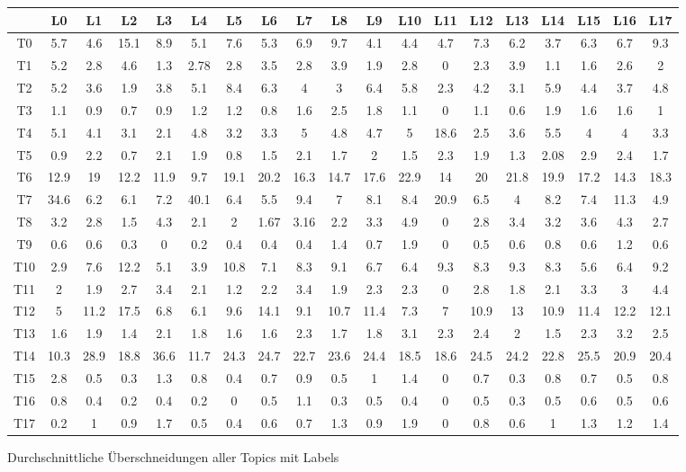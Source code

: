 \documentclass[german,version-2020-11]{uzl-thesis}
\begin{document}
\begin{figure}[H]
\begin{center}
\tiny
\renewcommand{\arraystretch}{2}
\begin{tabular}{ccccccccccccccccccc}
\hline
\hline
&L0&L1&L2&L3&L4&L5&L6&L7&L8&L9&L10&L11&L12&L13&L14&L15&L16&L17\\
\hline
T0&5.7&4.6&15.1&8.9&5.1&7.6&5.3&6.9&9.7&4.1&4.4&4.7&7.3&6.2&3.7&6.3&6.7&9.3\\\hline
T1&5.2&2.8&4.6&1.3&2.78&2.8&3.5&2.8&3.9&1.9&2.8&0&2.3&3.9&1.1&1.6&2.6&2\\\hline
T2&5.2&3.6&1.9&3.8&5.1&8.4&6.3&4&3&6.4&5.8&2.3&4.2&3.1&5.9&4.4&3.7&4.8\\\hline
T3&1.1&0.9&0.7&0.9&1.2&1.2&0.8&1.6&2.5&1.8&1.1&0&1.1&0.6&1.9&1.6&1.6&1\\\hline
T4&5.1&4.1&3.1&2.1&4.8&3.2&3.3&5&4.8&4.7&5&18.6&2.5&3.6&5.5&4&4&3.3\\\hline
T5&0.9&2.2&0.7&2.1&1.9&0.8&1.5&2.1&1.7&2&1.5&2.3&1.9&1.3&2.08&2.9&2.4&1.7\\\hline
T6&12.9&19&12.2&11.9&9.7&19.1&20.2&16.3&14.7&17.6&22.9&14&20&21.8&19.9&17.2&14.3&18.3\\\hline
T7&34.6&6.2&6.1&7.2&40.1&6.4&5.5&9.4&7&8.1&8.4&20.9&6.5&4&8.2&7.4&11.3&4.9\\\hline
T8&3.2&2.8&1.5&4.3&2.1&2&1.67&3.16&2.2&3.3&4.9&0&2.8&3.4&3.2&3.6&4.3&2.7\\\hline
T9&0.6&0.6&0.3&0&0.2&0.4&0.4&0.4&1.4&0.7&1.9&0&0.5&0.6&0.8&0.6&1.2&0.6\\\hline
T10&2.9&7.6&12.2&5.1&3.9&10.8&7.1&8.3&9.1&6.7&6.4&9.3&8.3&9.3&8.3&5.6&6.4&9.2\\\hline
T11&2&1.9&2.7&3.4&2.1&1.2&2.2&3.4&1.9&2.3&2.3&0&2.8&1.8&2.1&3.3&3&4.4\\\hline
T12&5&11.2&17.5&6.8&6.1&9.6&14.1&9.1&10.7&11.4&7.3&7&10.9&13&10.9&11.4&12.2&12.1\\\hline
T13&1.6&1.9&1.4&2.1&1.8&1.6&1.6&2.3&1.7&1.8&3.1&2.3&2.4&2&1.5&2.3&3.2&2.5\\\hline
T14&10.3&28.9&18.8&36.6&11.7&24.3&24.7&22.7&23.6&24.4&18.5&18.6&24.5&24.2&22.8&25.5&20.9&20.4\\\hline
T15&2.8&0.5&0.3&1.3&0.8&0.4&0.7&0.9&0.5&1&1.4&0&0.7&0.3&0.8&0.7&0.5&0.8\\\hline
T16&0.8&0.4&0.2&0.4&0.2&0&0.5&1.1&0.3&0.5&0.4&0&0.5&0.3&0.5&0.6&0.5&0.6\\\hline
T17&0.2&1&0.9&1.7&0.5&0.4&0.6&0.7&1.3&0.9&1.9&0&0.8&0.6&1&1.3&1.2&1.4\\\hline \hline
\end{tabular}
\caption{Durchschnittliche Überschneidungen aller Topics mit Labels}
\end{center}
\end{figure}
\end{document}
